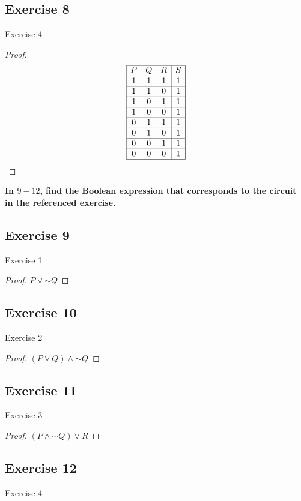 \documentclass[14pt]{extarticle}
\begin{document}
\subsection{Exercise 8} 
Exercise 4

\begin{proof} 
$$ 
\begin{array}{|ccc|c|} 
\hline 
P&Q&R&S\\ 
\hline 
1&1&1&1\\ 
\hline
1&1&0&1\\ 
\hline 
1&0&1&1\\ 
\hline 
1&0&0&1\\ 
\hline 
0&1&1&1\\ 
\hline 
0&1&0&1\\
\hline 
0&0&1&1\\ 
\hline 
0&0&0&1\\ 
\hline 
\end{array} 
$$ 
\end{proof}

{\bf \color{cyan} In $9-12$, find the Boolean expression that corresponds to the circuit in the referenced exercise.}

\subsection{Exercise 9} 
Exercise 1

\begin{proof} 
$P \vee {\sim Q}$ 
\end{proof}

\subsection{Exercise 10} 
Exercise 2

\begin{proof} 
$(P \vee Q) \wedge {\sim Q}$ 
\end{proof}

\subsection{Exercise 11} 
Exercise 3

\begin{proof} 
$(P \wedge {\sim Q}) \vee R$ 
\end{proof}

\subsection{Exercise 12} 
Exercise 4
\end{document}
